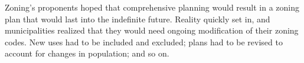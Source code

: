 Zoning's proponents hoped that comprehensive planning would result in a zoning
plan that would last into the indefinite future. Reality quickly set in, and
municipalities realized that they would need ongoing modification of their
zoning codes. New uses had to be included and excluded; plans had to be revised
to account for changes in population; and so on. 

